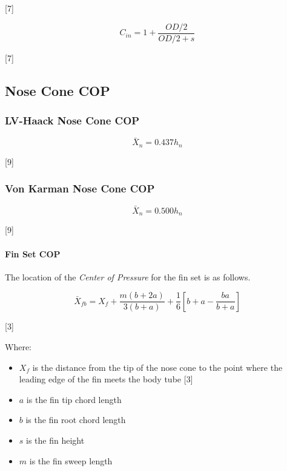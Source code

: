\documentclass[]{article}
\providecommand{\tightlist}{%
  \setlength{\itemsep}{0pt}\setlength{\parskip}{0pt}}
\let\oldparagraph\paragraph
\renewcommand{\paragraph}[1]{\oldparagraph{#1}\mbox{}}
\begin{document}
{[}7{]}

\begin{equation}
\label{eq_sd_interference}
C_{in} = 1 + \dfrac{OD/2}{OD/2 + s}
\end{equation}

{[}7{]}

\subsection{Nose Cone COP}\label{nose-cone-cop}

\subsubsection{LV-Haack Nose Cone COP}\label{lv-haack-nose-cone-cop}

\begin{equation}
\label{eq_cop_lv_haack}
\bar{X}_n = 0.437 h_n
\end{equation}

{[}9{]}

\subsubsection{Von Karman Nose Cone COP}\label{von-karman-nose-cone-cop}

\begin{equation}
\label{eq_cop_von_karman}
\bar{X}_n = 0.500 h_n
\end{equation}

{[}9{]}

\paragraph{Fin Set COP}\label{fin-set-cop}

The location of the \emph{Center of Pressure} for the fin set is as
follows.

\begin{equation}
\label{eq_cop_fin_set}
\bar{X}_{fb}
= 
X_f 
+ 
\dfrac {m ( b + 2 a )} {3 ( b + a ) } 
+ \dfrac{1}{6} 
\left[ b + a - \dfrac{b a}{b + a} \right]
\end{equation}

{[}3{]}

Where:

\begin{itemize}
\tightlist
\item
  \(X_f\) is the distance from the tip of the nose cone to the point
  where the leading edge of the fin meets the body tube {[}3{]}
\item
  \(a\) is the fin tip chord length
\item
  \(b\) is the fin root chord length
\item
  \(s\) is the fin height
\item
  \(m\) is the fin sweep length
\end{itemize}
\end{document}
